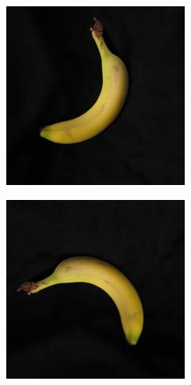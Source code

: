 \documentclass[final]{beamer}
\newlength{\onecolwid}
\begin{document}
\begin{frame}[t]
\begin{columns}[t]
\begin{column}{\onecolwid}
\begin{figure}
\begin{subfigure}{.123\textwidth}
\end{subfigure}%
 \begin{subfigure}{.123\textwidth}
  \centering
\includegraphics[width=\textwidth]{1_2.jpg}
\end{subfigure}%
  \begin{subfigure}{.123\textwidth}
  \centering
\includegraphics[width=\textwidth]{1_3.jpg}

\end{subfigure}
\end{figure}
\end{column}
\end{columns}
\end{frame}
\end{document}
